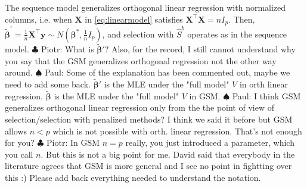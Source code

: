 \documentclass[aos]{imsart}
\theoremstyle{plain}
\newcommand{\piotr}[1]{{\small{\color{red} \sf $\clubsuit$ Piotr: #1}}}
\newcommand{\paul}[1]{{\small{\color{green} \sf $\spadesuit$ Paul: #1}}}
\newcommand{\bs}{\boldsymbol}
\begin{document}
The sequence model generalizes orthogonal linear regression with normalized columns, i.e. when $\bs X$ in \eqref{eq:linearmodel} satisfies $\bs X^\top \bs X=n I_p$.
Then, $\tilde{\bs \beta}^{\prime}=\frac{1}{n}\bs X^{\top}\bs y \sim N(\bs \beta^*,\tfrac{1}{n}I_p)$, and selection with $\hat{S}^b$ operates as in the sequence model.\piotr{What is $\tilde{\bs\beta}'$? Also, for the record, I still cannot understand why you say that the GSM generalizes orthogonal regression not the other way around.} \paul{Some of the explanation has been commented out, maybe we need to add some back. $\tilde{\bs\beta}'$ is the MLE under the "full model" $V$ in orth linear regression. $\tilde{\bs \beta}$ is the MLE under the "full model" $V$ in GSM.} \paul{I think GSM generalizes orthogonal linear regression only from the the point of view of selection/selection with penalized methods? I think we said it before but GSM allows $n<p$ which is not possible with orth. linear regression. That's not enough for you?}\piotr{In GSM $n=p$ really, you just introduced a parameter, which you call $n$. But this is not a big point for me. David said that everybody in the literature agrees that GSM is more general and I see no point in fightting over this :) Please add back everything needed to understand the notation. }

\end{document}
